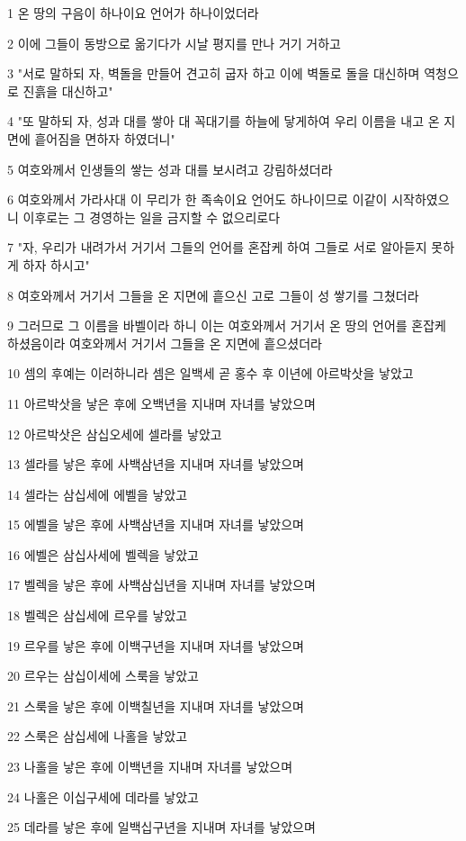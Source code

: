 \par 1 온 땅의 구음이 하나이요 언어가 하나이었더라
\par 2 이에 그들이 동방으로 옮기다가 시날 평지를 만나 거기 거하고
\par 3 "서로 말하되 자, 벽돌을 만들어 견고히 굽자 하고 이에 벽돌로 돌을 대신하며 역청으로 진흙을 대신하고"
\par 4 "또 말하되 자, 성과 대를 쌓아 대 꼭대기를 하늘에 닿게하여 우리 이름을 내고 온 지면에 흩어짐을 면하자 하였더니"
\par 5 여호와께서 인생들의 쌓는 성과 대를 보시려고 강림하셨더라
\par 6 여호와께서 가라사대 이 무리가 한 족속이요 언어도 하나이므로 이같이 시작하였으니 이후로는 그 경영하는 일을 금지할 수 없으리로다
\par 7 "자, 우리가 내려가서 거기서 그들의 언어를 혼잡케 하여 그들로 서로 알아듣지 못하게 하자 하시고"
\par 8 여호와께서 거기서 그들을 온 지면에 흩으신 고로 그들이 성 쌓기를 그쳤더라
\par 9 그러므로 그 이름을 바벨이라 하니 이는 여호와께서 거기서 온 땅의 언어를 혼잡케 하셨음이라 여호와께서 거기서 그들을 온 지면에 흩으셨더라
\par 10 셈의 후예는 이러하니라 셈은 일백세 곧 홍수 후 이년에 아르박삿을 낳았고
\par 11 아르박삿을 낳은 후에 오백년을 지내며 자녀를 낳았으며
\par 12 아르박삿은 삼십오세에 셀라를 낳았고
\par 13 셀라를 낳은 후에 사백삼년을 지내며 자녀를 낳았으며
\par 14 셀라는 삼십세에 에벨을 낳았고
\par 15 에벨을 낳은 후에 사백삼년을 지내며 자녀를 낳았으며
\par 16 에벨은 삼십사세에 벨렉을 낳았고
\par 17 벨렉을 낳은 후에 사백삼십년을 지내며 자녀를 낳았으며
\par 18 벨렉은 삼십세에 르우를 낳았고
\par 19 르우를 낳은 후에 이백구년을 지내며 자녀를 낳았으며
\par 20 르우는 삼십이세에 스룩을 낳았고
\par 21 스룩을 낳은 후에 이백칠년을 지내며 자녀를 낳았으며
\par 22 스룩은 삼십세에 나홀을 낳았고
\par 23 나홀을 낳은 후에 이백년을 지내며 자녀를 낳았으며
\par 24 나홀은 이십구세에 데라를 낳았고
\par 25 데라를 낳은 후에 일백십구년을 지내며 자녀를 낳았으며
